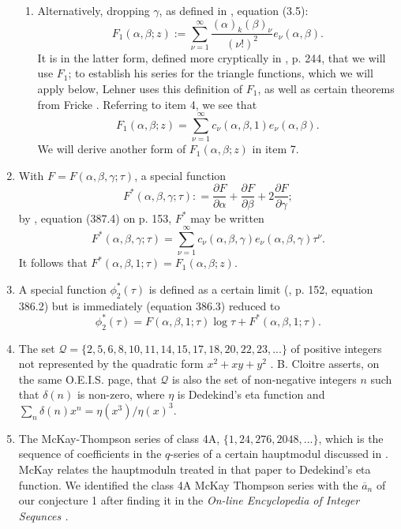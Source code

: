 \documentclass{article}
\begin{document}
\begin{enumerate}
\begin{enumerate}
    \item Alternatively,
    dropping $\gamma$, as defined in 
    \cite{leo2008fourier}, equation (3.5):
$$
F_1(\alpha,\beta;z):= 
\sum_{\nu=1}^{\infty}
\frac{(\alpha)_k(\beta)_{\nu}}{(\nu!)^2}
e_{\nu}(\alpha, \beta).$$
It is in the latter form, defined
more cryptically in \cite{lehner1954note}, p. 244,
that we will use $F_1$; to
establish his series for the triangle functions,
which we will apply below,
Lehner uses this definition of
$F_1$, as well as certain 
theorems from  Fricke
\cite{fricke1922elliptischen}.
Referring to item 4, we see that
$$
F_1(\alpha,\beta;z)= 
\sum_{\nu=1}^{\infty}
c_{\nu}(\alpha,\beta,1)
e_{\nu}(\alpha, \beta).$$
We will derive another form of $F_1(\alpha,\beta;z)$
in item 7.
\end{enumerate}
\item With 
$F = F(\alpha, \beta, \gamma;\tau)$,  
a special function
$$F^*(\alpha, \beta, \gamma;\tau): = 
\frac{\partial F}{\partial \alpha} + 
\frac{\partial F}{\partial \beta}+ 
2\frac{\partial F}{\partial \gamma};$$
by \cite{caratheodory2}, equation (387.4) on p. 153, 
$F^*$ may be written
$$
F^*(\alpha, \beta, \gamma;\tau) =
\sum_{{\nu} = 1}^{\infty}
c_{\nu} (\alpha, \beta, \gamma) 
e_{\nu} (\alpha, \beta, \gamma) \tau^{\nu}.
$$
It follows that $F^*(\alpha, \beta, 1;\tau) = F_1(\alpha,\beta;z)$.
\item A special  function
$\phi_2^*(\tau)$ is defined as a certain limit
(\cite{caratheodory2},
p. 152, equation 386.2)
but is immediately (equation 386.3) 
reduced to 
$$\phi_2^*(\tau) =  
F(\alpha, \beta, 1;\tau) \log \tau
+ F^*(\alpha, \beta, 1;\tau).$$
\item The set $\mathscr{Q} 
=\{2,5,6,8,10,11,14,15,17,18,20,22,23,...\}$
of positive integers not
represented by the quadratic form
$x^2+xy+y^2$ \cite{OEIS}. B. Cloitre
asserts, on the same O.E.I.S.
page, that  $\mathscr{Q}$ is also the set of
non-negative integers $n$
such that
$\delta(n)$ is non-zero, where
$\eta$ is Dedekind's eta function and
$\sum_n \delta(n)x^n = \eta(x^3)/\eta(x)^3.$
\item The McKay-Thompson series of class 4A,
$\{1,24, 276, 2048, ...\}$, which is
the sequence of coefficients 
in the $q$-series of a certain
hauptmodul discussed in \cite{doi}.
McKay relates
the hauptmoduln treated in that paper 
to Dedekind's eta function.
We identified the class 4A
McKay Thompson series with the
$\overline{a}_n$ of our
conjecture 1 after finding it 
in the \it On-line Encyclopedia
of Integer Sequnces \rm \cite{OEIS2}.
\end{enumerate}
\end{document}
